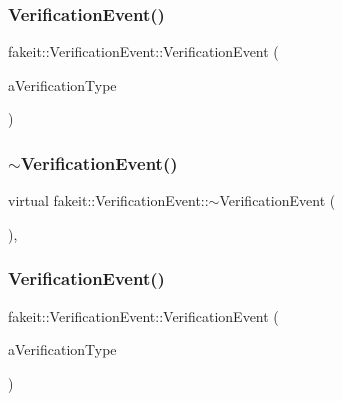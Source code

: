 \subsubsection{\texorpdfstring{VerificationEvent()}{VerificationEvent()}\hspace{0.1cm}{\footnotesize\ttfamily [2/9]}}
{\footnotesize\ttfamily fakeit\+::\+Verification\+Event\+::\+Verification\+Event (\begin{DoxyParamCaption}\item[{\mbox{\hyperlink{namespacefakeit_a9df22520dd60badb149c1d1d2518b253}{Verification\+Type}}}]{a\+Verification\+Type }\end{DoxyParamCaption})\hspace{0.3cm}{\ttfamily [inline]}}

\mbox{\label{structfakeit_1_1VerificationEvent_a5bcca5502a6be4d65db30c1927652a77}} 
\subsubsection{\texorpdfstring{$\sim$VerificationEvent()}{~VerificationEvent()}\hspace{0.1cm}{\footnotesize\ttfamily [2/9]}}
{\footnotesize\ttfamily virtual fakeit\+::\+Verification\+Event\+::$\sim$\+Verification\+Event (\begin{DoxyParamCaption}{ }\end{DoxyParamCaption})\hspace{0.3cm}{\ttfamily [virtual]}, {\ttfamily [default]}}

\mbox{\label{structfakeit_1_1VerificationEvent_afc2366f1ae4d03ec60cc2a2253a79728}} 
\subsubsection{\texorpdfstring{VerificationEvent()}{VerificationEvent()}\hspace{0.1cm}{\footnotesize\ttfamily [3/9]}}
{\footnotesize\ttfamily fakeit\+::\+Verification\+Event\+::\+Verification\+Event (\begin{DoxyParamCaption}\item[{\mbox{\hyperlink{namespacefakeit_a9df22520dd60badb149c1d1d2518b253}{Verification\+Type}}}]{a\+Verification\+Type }\end{DoxyParamCaption})\hspace{0.3cm}{\ttfamily [inline]}}

